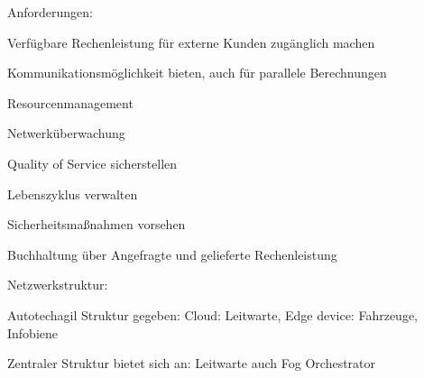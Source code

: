 \begin{notes}
    \item Anforderungen:
    \begin{notes}
        \item Verfügbare Rechenleistung für externe Kunden zugänglich machen
        \item Kommunikationsmöglichkeit bieten, auch für parallele Berechnungen
        \item Resourcenmanagement
        \item Netwerküberwachung
        \item Quality of Service sicherstellen    
        \item Lebenszyklus verwalten
        \item Sicherheitsmaßnahmen vorsehen
        \item Buchhaltung über Angefragte und gelieferte Rechenleistung
    \end{notes}
    \item Netzwerkstruktur:
    \begin{notes}
        \item Autotechagil Struktur gegeben: Cloud: Leitwarte, Edge device: Fahrzeuge, Infobiene
        \item Zentraler Struktur bietet sich an: Leitwarte auch Fog Orchestrator
        \item 
    \end{notes}
\end{notes}